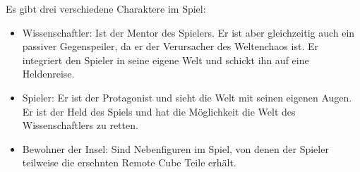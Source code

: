 
Es gibt drei verschiedene Charaktere im Spiel:

\begin{itemize}
\item Wissenschaftler: Ist der Mentor des Spielers. Er ist aber gleichzeitig auch ein passiver Gegenspeiler, da er der Verursacher des Weltenchaos ist. Er integriert den Spieler in seine eigene Welt und schickt ihn auf eine Heldenreise.
\item Spieler: Er ist der Protagonist und sieht die Welt mit seinen eigenen Augen. Er ist der Held des Spiels und hat die Möglichkeit die Welt des Wissenschaftlers zu retten.
\item Bewohner der Insel: Sind Nebenfiguren im Spiel, von denen der Spieler teilweise die ersehnten Remote Cube Teile erhält.
\end{itemize}